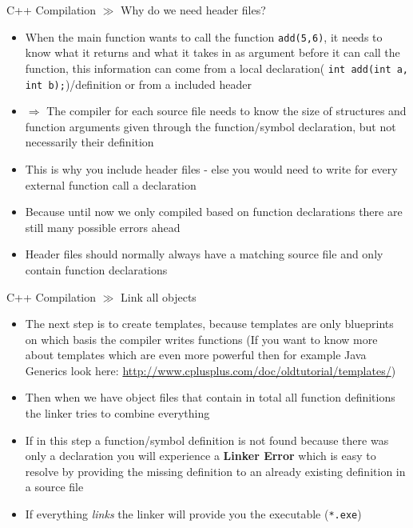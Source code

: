 \documentclass[10pt]{beamer}
\begin{document}
\begin{frame}{C++ Compilation $\gg$ Why do we need header files?}
\begin{itemize}
	\item When the main function wants to call the function \texttt{add(5,6)}, it needs to know what it returns and what it takes in as argument before it can call the function, this information can come from a local declaration( \texttt{int add(int a, int b);})/definition or from a included header
	\item $\Rightarrow$ The compiler for each source file needs to know the size of structures and function arguments given through the function/symbol declaration, but not necessarily their definition
	\item This is why you include header files - else you would need to write for every external function call a declaration
	\item Because until now we only compiled based on function declarations there are still many possible errors ahead
	\item Header files should normally always have a matching source file and only contain function declarations
\end{itemize}
\end{frame}

\begin{frame}{C++ Compilation $\gg$ Link all objects}
\begin{itemize}
	\item The next step is to create templates, because templates are only blueprints on which basis the compiler writes functions (If you want to know more about templates which are even more powerful then for example Java Generics look here: \url{http://www.cplusplus.com/doc/oldtutorial/templates/})
	\item Then when we have object files that contain in total   all function definitions the linker tries to combine everything
	\item If in this step a function/symbol definition is not found because there was only a declaration you will experience a \textbf{Linker Error} which is easy to resolve by providing the missing definition to an already existing definition in a source file
	\item If everything \textit{links} the linker will provide you the executable (\texttt{*.exe})
\end{itemize}
\end{frame}
\end{document}
